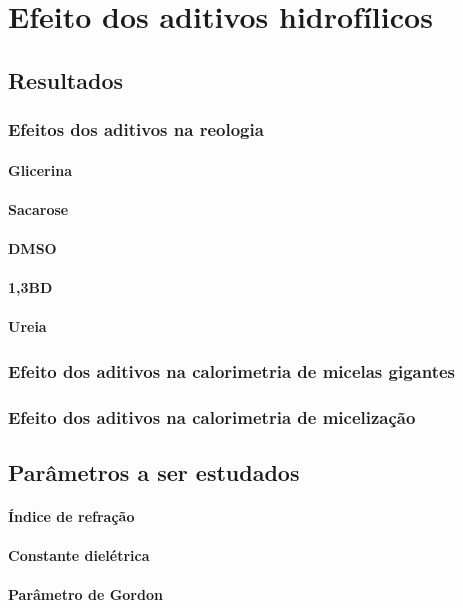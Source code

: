 \part{Efeito dos aditivos hidrofílicos}
	\chapter{Resultados}
		\section{Efeitos dos aditivos na reologia}
			\subsection{Glicerina}
			\subsection{Sacarose}
			\subsection{DMSO}
			\subsection{1,3BD}
			\subsection{Ureia}
		\section{Efeito dos aditivos na calorimetria de micelas gigantes}
		\section{Efeito dos aditivos na calorimetria de micelização}
	\chapter{Parâmetros a ser estudados}
		\subsection{Índice de refração}
		\subsection{Constante dielétrica}
		\subsection{Parâmetro de Gordon}

